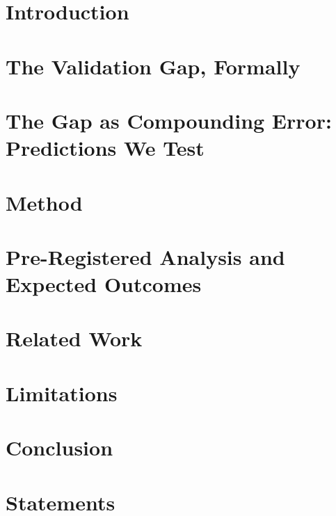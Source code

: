 \documentclass[11pt]{article}
\begin{document}
\section{Introduction}


\section{The Validation Gap, Formally}


\section{The Gap as Compounding Error: Predictions We Test}


\section{Method}


\section{Pre-Registered Analysis and Expected Outcomes}


\section{Related Work}


\section{Limitations}


\section{Conclusion}


\section*{Statements}




\end{document}
